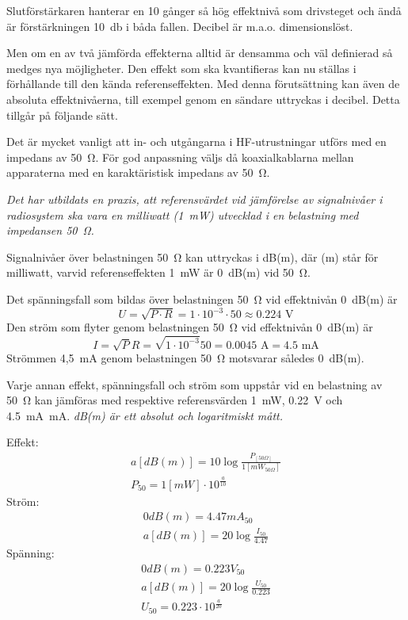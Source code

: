 Slutförstärkaren hanterar en 10 gånger så hög effektnivå som drivsteget och ändå
är förstärkningen \SI{10}{\decibel} i båda fallen.
Decibel är m.a.o. dimensionslöst.

Men om en av två jämförda effekterna alltid är densamma och väl
definierad så medges nya möjligheter. Den effekt som ska
kvantifieras kan nu ställas i förhållande till den kända
referenseffekten. Med denna förutsättning kan även de absoluta
effektnivåerna, till exempel genom en sändare uttryckas i decibel. Detta
tillgår på följande sätt.

Det är mycket vanligt att in- och utgångarna i HF-utrustningar utförs
med en impedans av \SI{50}{\ohm}.
För god anpassning väljs då koaxialkablarna mellan apparaterna med en
karaktäristisk impedans av \SI{50}{\ohm}.

\emph{Det har utbildats en praxis, att referensvärdet vid jämförelse
  av signalnivåer i radiosystem ska vara en milliwatt (1~mW)
  utvecklad i en belastning med impedansen \SI{50}{\ohm}.}

Signalnivåer över belastningen \SI{50}{\ohm} kan uttryckas i dB(m), där (m)
står för milliwatt, varvid referenseffekten \SI{1}{\milli\watt} är 0~dB(m) vid
\SI{50}{\ohm}.

Det spänningsfall som bildas över belastningen \SI{50}{\ohm} vid effektnivån
0~dB(m) är
\[U = \sqrt{P\cdot R} = 1\cdot 10^{-3} \cdot 50 \approx 0.224 \text{ V}\]
Den ström som flyter genom belastningen \SI{50}{\ohm} vid effektnivån 0~dB(m)
är
\[
I = \sqrt{P}{R} = \sqrt{1\cdot 10^{-3}}{50} = 0.0045 \text{ A} = 4.5 \text{ mA}
\]
Strömmen 4,5~mA genom belastningen \SI{50}{\ohm} motsvarar således 0~dB(m).

Varje annan effekt, spänningsfall och ström som uppstår vid en belastning av
\SI{50}{\ohm} kan jämföras med respektive referensvärden \SI{1}{\milli\watt},
\SI{0,22}{\volt} och \SI{4,5}{\milli\ampere}~mA.
\emph{dB(m) är ett absolut och logaritmiskt mått.}

\noindent
Effekt:
\begin{gather*}
  a [dB(m)] = 10 \log\frac{P_{[50\Omega]}}{1[mW_{50\Omega}]} \\
  P_{50} = 1 [mW] \cdot 10^{\frac{a}{10}}
\end{gather*}
Ström:
\begin{gather*}
  0 dB(m) = 4.47 mA_{50} \\
  a [dB(m)] = 20 \log\frac{I_{50}}{4.47}
\end{gather*}
Spänning:
\begin{gather*}
  0 dB(m) = 0.223 V_{50} \\
  a [dB(m)] = 20 \log\frac{U_{50}}{0.223} \\
  U_{50} = 0.223 \cdot 10^{\frac{a}{20}}
\end{gather*}

